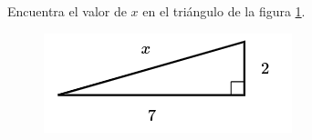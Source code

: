 Encuentra el valor de $x$ en el triángulo de la figura \ref{fig:lados_pitagoras_18}.

\begin{minipage}[t][][t]{0.35\textwidth}
    \begin{figure}[H]
        \centering
        \includegraphics[width=0.9\linewidth]{../images/lados_pitagoras_18.png}
        \caption{}
        \label{fig:lados_pitagoras_18}
    \end{figure}
\end{minipage}\hfill
